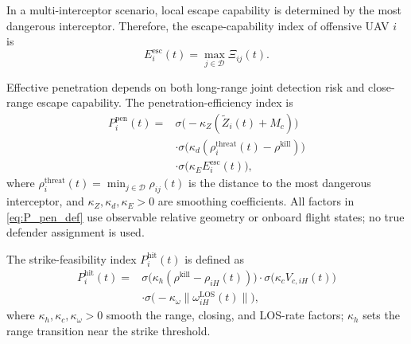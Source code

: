 \documentclass{cja}
\begin{document}
In a multi-interceptor scenario, local escape capability is determined by the most dangerous interceptor. Therefore, the escape-capability index of offensive UAV $i$ is
\begin{equation}
E_i^{\mathrm{esc}}(t)
=
\max_{j\in\mathcal{D}} \Xi_{ij}(t).
\end{equation}

Effective penetration depends on both long-range joint detection risk and close-range escape capability. The penetration-efficiency index is
\begin{equation}
\begin{aligned}
P_i^{\mathrm{pen}}(t)
={}&
\sigma\!\bigl(-\kappa_Z(\widetilde Z_i(t)+M_c)\bigr)\\
&\cdot
\sigma\!\bigl(\kappa_d(\rho_i^{\mathrm{threat}}(t)-\rho^{\mathrm{kill}})\bigr)\\
&\cdot
\sigma\!\bigl(\kappa_E E_i^{\mathrm{esc}}(t)\bigr),
\end{aligned}
\label{eq:P_pen_def}
\end{equation}
where $\rho_i^{\mathrm{threat}}(t)=\min_{j\in\mathcal{D}}\rho_{ij}(t)$ is the distance to the most dangerous interceptor, and $\kappa_Z,\kappa_d,\kappa_E>0$ are smoothing coefficients. All factors in \eqref{eq:P_pen_def} use observable relative geometry or onboard flight states; no true defender assignment is used.

The strike-feasibility index $P_i^{\mathrm{hit}}(t)$ is defined as
\begin{equation}
\begin{aligned}
P_i^{\mathrm{hit}}(t)
={}&
\sigma\!\bigl(\kappa_h(\rho^{\mathrm{kill}}-\rho_{iH}(t))\bigr)
\cdot
\sigma\!\bigl(\kappa_c V_{c,iH}(t)\bigr)\\
&\cdot
\sigma\!\bigl(-\kappa_{\omega}\|\omega_{iH}^{\mathrm{LOS}}(t)\|\bigr),
\end{aligned}
\label{eq:P_hit_def}
\end{equation}
where $\kappa_h,\kappa_c,\kappa_{\omega}>0$ smooth the range, closing, and LOS-rate factors; $\kappa_h$ sets the range transition near the strike threshold.
\end{document}
